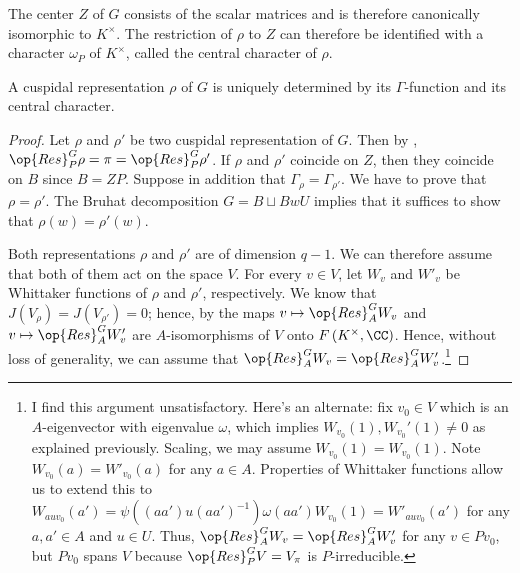 \documentclass[../main.tex]{subfiles}
\begin{document}
The center $Z$ of $G$ consists of the scalar matrices and is therefore canonically isomorphic to $K^\times$. The restriction of $\rho$ to $Z$ can therefore be identified with a character $\omega_P$ of $K^\times$, called the central character of $\rho$.
\begin{proposition}
	A cuspidal representation $\rho$ of $G$ is uniquely determined by its $\Gamma$-function and its central character.
\end{proposition}
\begin{proof}
	Let $\rho$ and $\rho'$ be two cuspidal representation of $G$. Then by , $\op{Res}^G_P\rho=\pi=\op{Res}^G_P\rho'$. If $\rho$ and $\rho'$ coincide on $Z$, then they coincide on $B$ since $B=ZP$. Suppose in addition that $\Gamma_\rho=\Gamma_{\rho'}$. We have to prove that $\rho=\rho'$. The Bruhat decomposition $G=B\sqcup BwU$ implies that it suffices to show that $\rho(w)=\rho'(w)$.

	Both representations $\rho$ and $\rho'$ are of dimension $q-1$. We can therefore assume that both of them act on the space $V$. For every $v\in V$, let $W_v$ and $W'_v$ be Whittaker functions of $\rho$ and $\rho'$, respectively. We know that $J(V_\rho)=J(V_{\rho'})=0$; hence, by  the maps $v\mapsto\op{Res}^G_AW_v$ and $v\mapsto\op{Res}^G_AW'_v$ are $A$-isomorphisms of $V$ onto $F\left(K^\times,\CC\right)$. Hence, without loss of generality, we can assume that $\op{Res}^G_AW_v=\op{Res}_A^GW'_v$.\footnote{I find this argument unsatisfactory. Here's an alternate: fix $v_0\in V$ which is an $A$-eigenvector with eigenvalue $\omega$, which implies $W_{v_0}(1),W_{v_0}'(1)\ne0$ as explained previously. Scaling, we may assume $W_{v_0}(1)=W_{v_0}(1)$. Note $W_{v_0}(a)=W'_{v_0}(a)$ for any $a\in A$. Properties of Whittaker functions allow us to extend this to $W_{auv_0}(a')=\psi\left((aa')u(aa')^{-1}\right)\omega(aa')W_{v_0}(1)=W'_{auv_0}(a')$ for any $a,a'\in A$ and $u\in U$. Thus, $\op{Res}^G_AW_v=\op{Res}^G_AW_v'$ for any $v\in Pv_0$, but $Pv_0$ spans $V$ because $\op{Res}^G_PV=V_\pi$ is $P$-irreducible.}


\end{proof}
\end{document}
